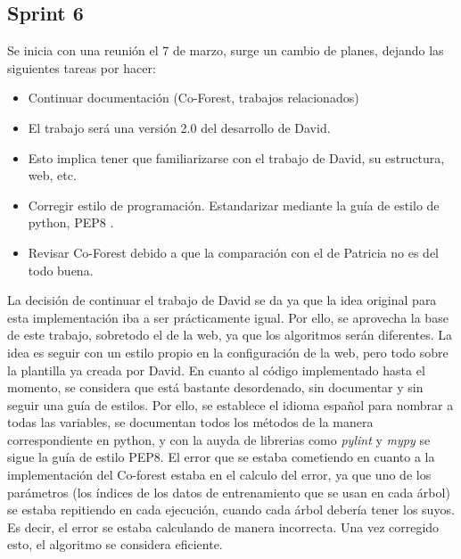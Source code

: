 \subsection{Sprint 6}
Se inicia con una reunión el 7 de marzo, surge un cambio de planes, dejando las siguientes tareas por hacer:
\begin{itemize}
	\item Continuar documentación (Co-Forest, trabajos relacionados)
	\item El trabajo será una versión 2.0 del desarrollo de David.
	\item Esto implica tener que familiarizarse con el trabajo de David, su estructura, web, etc.
	\item Corregir estilo de programación. Estandarizar mediante la guía de estilo de python, PEP8 \cite{PEP8}. %
	\item Revisar Co-Forest debido a que la comparación con el de Patricia no es del todo buena.
	
\end{itemize} 
La decisión de continuar el trabajo de David se da ya que la idea original para esta implementación iba a ser prácticamente igual. Por ello, se aprovecha la base de este trabajo, sobretodo el de la web, ya que los algoritmos serán diferentes. La idea es seguir con un estilo propio en la configuración de la web, pero todo sobre la plantilla ya creada por David. 
En cuanto al código implementado hasta el momento, se considera que está bastante desordenado, sin documentar y sin seguir una guía de estilos. Por ello, se establece el idioma español para nombrar a todas las variables, se documentan todos los métodos de la manera correspondiente en python, y con la auyda de librerias como \textit{pylint} y \textit{mypy} se sigue la guía de estilo PEP8.
El error que se estaba cometiendo en cuanto a la implementación del Co-forest estaba en el calculo del error, ya que uno de los parámetros (los índices de los datos de entrenamiento que se usan en cada árbol) se estaba repitiendo en cada ejecución, cuando cada árbol debería tener los suyos. Es decir, el error se estaba calculando de manera incorrecta. Una vez corregido esto, el algoritmo se considera eficiente.

